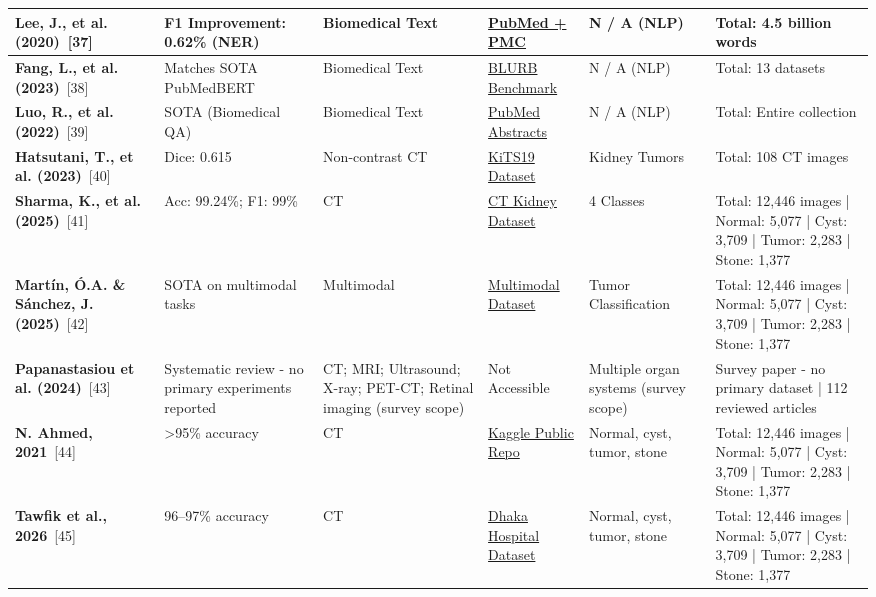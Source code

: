 \documentclass{article}
\begin{document}
\begin{longtable}{|L{2.8cm}|L{2.5cm}|L{1.5cm}|L{3.5cm}|L{3.5cm}|L{4.5cm}|}
\hline
\textbf{Lee, J., et al. (2020)}~[37] & F1 Improvement: 0.62\% (NER) & Biomedical Text & \href{https://github.com/naver/biobert-pretrained}{PubMed + PMC} & N / A (NLP) & Total: 4.5 billion words \\
\hline
\textbf{Fang, L., et al. (2023)}~[38] & Matches SOTA PubMedBERT & Biomedical Text & \href{https://huggingface.co/datasets/bigbio/blurb}{BLURB Benchmark} & N / A (NLP) & Total: 13 datasets \\
\hline
\textbf{Luo, R., et al. (2022)}~[39] & SOTA (Biomedical QA) & Biomedical Text & \href{https://huggingface.co/datasets/ncbi/pubmed}{PubMed Abstracts} & N / A (NLP) & Total: Entire collection \\
\hline
\textbf{Hatsutani, T., et al. (2023)}~[40] & Dice: 0.615 & Non-contrast CT & \href{https://github.com/neheller/kits19/tree/master/data}{KiTS19 Dataset} & Kidney Tumors & Total: 108 CT images \\
\hline
\textbf{Sharma, K., et al. (2025)}~[41] & Acc: 99.24\%; F1: 99\% & CT & \href{https://www.kaggle.com/datasets/nazmul0087/ct-kidney-dataset-normal-cyst-tumor-and-stone}{CT Kidney Dataset} & 4 Classes & Total: 12,446 images | Normal: 5,077 | Cyst: 3,709 | Tumor: 2,283 | Stone: 1,377 \\
\hline
\textbf{Martín, Ó.A. \& Sánchez, J. (2025)}~[42] & SOTA on multimodal tasks & Multimodal & \href{https://www.kaggle.com/datasets/nazmul0087/ct-kidney-dataset-normal-cyst-tumor-and-stone}{Multimodal Dataset} & Tumor Classification & Total: 12,446 images | Normal: 5,077 | Cyst: 3,709 | Tumor: 2,283 | Stone: 1,377 \\
\hline
\textbf{Papanastasiou et al. (2024)}~[43] & Systematic review - no primary experiments reported & CT; MRI; Ultrasound; X-ray; PET-CT; Retinal imaging (survey scope) & Not Accessible & Multiple organ systems (survey scope) & Survey paper - no primary dataset | 112 reviewed articles \\
\hline
\textbf{N. Ahmed, 2021}~[44] & >95\% accuracy & CT & \href{https://www.kaggle.com/datasets/nazmul0087/ct-kidney-dataset-normal-cyst-tumor-and-stone}{Kaggle Public Repo} & Normal, cyst, tumor, stone & Total: 12,446 images | Normal: 5,077 | Cyst: 3,709 | Tumor: 2,283 | Stone: 1,377 \\
\hline
\textbf{Tawfik et al., 2026}~[45] & 96–97\% accuracy & CT & \href{https://www.kaggle.com/datasets/nazmul0087/ct-kidney-dataset-normal-cyst-tumor-and-stone}{Dhaka Hospital Dataset} & Normal, cyst, tumor, stone & Total: 12,446 images | Normal: 5,077 | Cyst: 3,709 | Tumor: 2,283 | Stone: 1,377 \\

\end{longtable}
\end{document}
